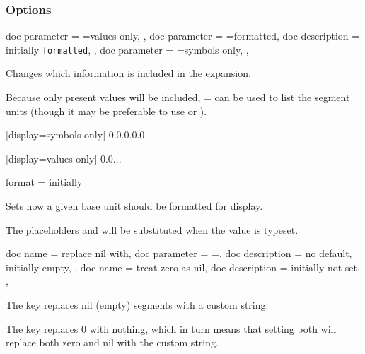 \documentclass[
	a4paper,
	margin=4cm
]{article}
\begin{document}
\clearpage
\subsubsection{Options}
	
\begin{docKeys}[
		doc name = display,
	]{
		{
			doc parameter = {=values only},
		},
		{
			doc parameter = {=formatted},
			doc description = initially \texttt{formatted},
		},
		{
			doc parameter = {=symbols only},
		},
	}

Changes which information is included in the expansion.

Because only present values will be included, = can be used to list the segment units (though it may be preferable to use  or ).

\begin{dispExample}
	[display=symbols only]
	{0.0.0.0.0}

	[display=values only]
	{0.0...}
\end{dispExample}
\end{docKeys}

\begin{docKey}
	{format}
	{=}
	{initially }

	Sets how a given base unit should be formatted for display.
	
	The placeholders  and  will be substituted when the value is typeset.
\end{docKey}

\begin{docKeys}
	[]
	{
		{
			doc name = replace nil with,
			doc parameter = {=},
			doc description = {no default, initially empty},
		},
		{
			doc name = treat zero as nil,
			doc description = {initially not set},
		},
	}

The key  replaces nil (empty) segments with a custom string.

The key  replaces 0 with nothing, which in turn means that setting both will replace both zero and nil with the custom string.

\end{docKeys}
\end{document}

